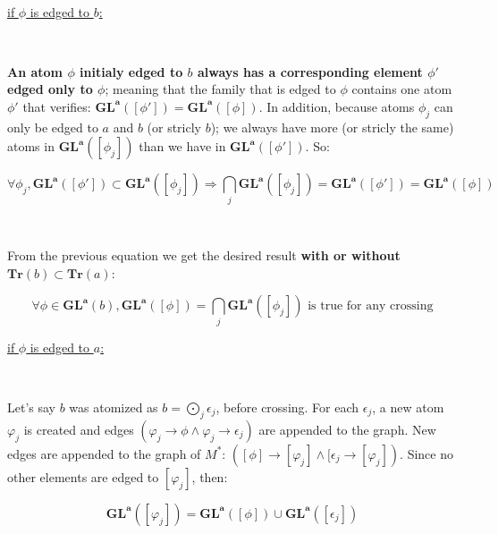 \documentclass[a4paper, 11pt]{article}
\begin{document}
\

\noindent
\underline{if $\phi$ is edged to $b$:}

\

\textbf{An atom $\phi$ initialy edged to $b$ always has a corresponding element $\phi'$ edged only to $\phi$}; meaning that the family that is edged to $\phi$ contains one atom $\phi'$ that verifies: $\boldsymbol{GL}^{\boldsymbol{a}}([\phi']) = \boldsymbol{GL}^{\boldsymbol{a}}([\phi])$. In addition, because atoms $\phi_j$ can only be edged to $a$ and $b$ (or stricly $b$); we always have more (or stricly the same) atoms in $\boldsymbol{GL}^{\boldsymbol{a}}([\phi_j])$ than we have in $\boldsymbol{GL}^{\boldsymbol{a}}([\phi'])$. So:

\begin{equation*}
    \forall \phi_j, \boldsymbol{GL}^{\boldsymbol{a}}([\phi']) \subset \boldsymbol{GL}^{\boldsymbol{a}}([\phi_j]) \Rightarrow \bigcap_j \boldsymbol{GL}^{\boldsymbol{a}}([\phi_j]) = \boldsymbol{GL}^{\boldsymbol{a}}([\phi']) = \boldsymbol{GL}^{\boldsymbol{a}}([\phi])
\end{equation*}

\

From the previous equation we get the desired result \textbf{with or without $\textbf{Tr}(b) \subset \textbf{Tr}(a)$}:

\begin{equation*}
    \forall \phi \in \boldsymbol{GL}^{\boldsymbol{a}}(b), \boldsymbol{GL}^{\boldsymbol{a}}([\phi]) = \bigcap_j \boldsymbol{GL}^{\boldsymbol{a}}([\phi_j]) \text{ is true for any crossing}
\end{equation*}

\noindent
\underline{if $\phi$ is edged to $a$:}

\

Let's say $b$ was atomized as $b = \bigodot_j \epsilon_j$, before crossing. For each $\epsilon_j$, a new atom $\varphi_j$ is created and edges $(\varphi_j \rightarrow \phi \land \varphi_j \rightarrow \epsilon_j)$ are appended to the graph. New edges are appended to the graph of $M^{\ast}$: $([\phi] \rightarrow [\varphi_j] \land [\epsilon_j \rightarrow [\varphi_j])$. Since no other elements are edged to $[\varphi_j]$, then:

\begin{equation*}
    \boldsymbol{GL}^{\boldsymbol{a}}([\varphi_j]) = \boldsymbol{GL}^{\boldsymbol{a}}([\phi])\cup\boldsymbol{GL}^{\boldsymbol{a}}([\epsilon_j])
\end{equation*}
\end{document}
